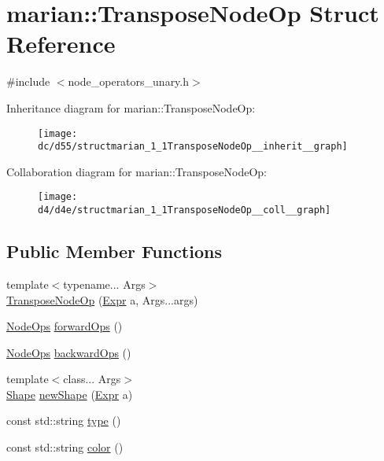\hypertarget{structmarian_1_1TransposeNodeOp}{}\section{marian\+:\+:Transpose\+Node\+Op Struct Reference}
\label{structmarian_1_1TransposeNodeOp}


{\ttfamily \#include $<$node\+\_\+operators\+\_\+unary.\+h$>$}



Inheritance diagram for marian\+:\+:Transpose\+Node\+Op\+:
\nopagebreak
\begin{figure}[H]
\begin{center}
\leavevmode
\texttt{[image: dc/d55/structmarian\_1\_1TransposeNodeOp\_\_inherit\_\_graph]}
\end{center}
\end{figure}


Collaboration diagram for marian\+:\+:Transpose\+Node\+Op\+:
\nopagebreak
\begin{figure}[H]
\begin{center}
\leavevmode
\texttt{[image: d4/d4e/structmarian\_1\_1TransposeNodeOp\_\_coll\_\_graph]}
\end{center}
\end{figure}
\subsection*{Public Member Functions}
\begin{DoxyCompactItemize}
\item 
{\footnotesize template$<$typename... Args$>$ }\\\hyperlink{structmarian_1_1TransposeNodeOp_a29f25f7ab9129e9752571e6c4c7ccf26}{Transpose\+Node\+Op} (\hyperlink{namespacemarian_a498d8baf75b754011078b890b39c8e12}{Expr} a, Args...\+args)
\item 
\hyperlink{namespacemarian_a4956376218cc236016c20bc4071470da}{Node\+Ops} \hyperlink{structmarian_1_1TransposeNodeOp_a963c8d08cf6cb274d9d5c88361317864}{forward\+Ops} ()
\item 
\hyperlink{namespacemarian_a4956376218cc236016c20bc4071470da}{Node\+Ops} \hyperlink{structmarian_1_1TransposeNodeOp_ac924d0a88ccf18ed27ffc6e10a5fd075}{backward\+Ops} ()
\item 
{\footnotesize template$<$class... Args$>$ }\\\hyperlink{structmarian_1_1Shape}{Shape} \hyperlink{structmarian_1_1TransposeNodeOp_a673f354b5892c9f835f470a297f4f22c}{new\+Shape} (\hyperlink{namespacemarian_a498d8baf75b754011078b890b39c8e12}{Expr} a)
\item 
const std\+::string \hyperlink{structmarian_1_1TransposeNodeOp_a72262ff92b274ed93ccc389ec556638a}{type} ()
\item 
const std\+::string \hyperlink{structmarian_1_1TransposeNodeOp_a207e692b92be4e144ace62033039b1cc}{color} ()
\end{DoxyCompactItemize}
